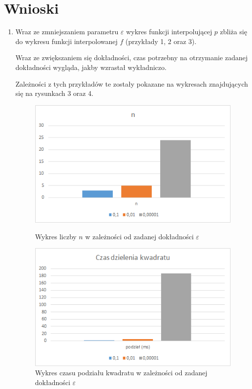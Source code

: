 \documentclass[12pt]{article}
\begin{document}
	\section{Wnioski}
	\begin{enumerate}
		\item Wraz ze zmniejszaniem parametru $\varepsilon$ wykres funkcji interpolującej $p$ zbliża się do wykresu funkcji interpolowanej $f$ (przykłady 1, 2 oraz 3).
		
		Wraz ze zwiększaniem się dokładności, czas potrzebny na otrzymanie zadanej dokładności wygląda, jakby wzrastał wykładniczo.
		
		Zależności z tych przykładów te zostały pokazane na wykresach znajdujących się na rysunkach 3 oraz 4.
		
		
		\begin{figure}
			\centering
			\includegraphics[]{images/wykres-n.png}
			\caption{Wykres liczby $n$ w zależności od zadanej dokładności $\varepsilon$}
			
			\includegraphics[]{images/wykres-czas-dzielenia.png}
			\caption{Wykres czasu podziału kwadratu w zależności od zadanej dokładności $\varepsilon$}
		\end{figure}


\end{enumerate}
\end{document}
